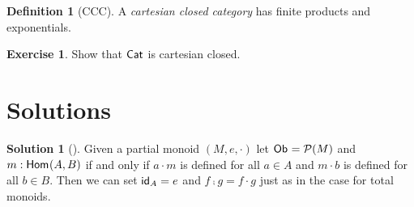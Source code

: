 \documentclass[a4paper,fleqn]{scrartcl}
\theoremstyle{definition}
\newtheorem{definition}{Definition}
\newtheorem*{solution}{Solution}
\newtheorem{exercise}{Exercise}
\begin{document}
\begin{definition}[CCC]
  A \emph{cartesian closed category} has finite products and exponentials.
\end{definition}
\begin{exercise}
  Show that $\Cat$ is cartesian closed.
\end{exercise}

\printbibliography

\clearpage

\appendix

\section{Solutions}

\begin{solution}[]
  Given a partial monoid $(M,e,\cdot)$ let $\Ob = \Pot(M)$ and
  $m : \Hom(A,B)$ if and only if $a \cdot m$ is defined for all $a \in A$ and $m
  \cdot b$ is defined for all $b \in B$.  Then we can set $\id[A] = e$
  and $f \comp g = f \cdot g$ just as in the case for total monoids.
\end{solution}
\end{document}
